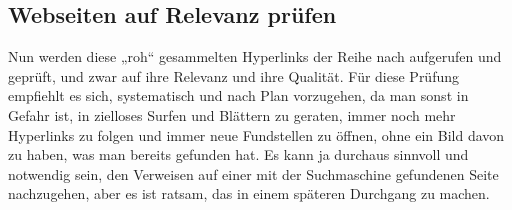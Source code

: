 \documentclass[]{book}
\theoremstyle{definition}
\theoremstyle{definition}
\theoremstyle{definition}
\theoremstyle{remark}
\begin{document}
\subsection{Webseiten auf Relevanz
prüfen}\label{webseiten-auf-relevanz-prufen}

Nun werden diese „roh`` gesammelten Hyperlinks der Reihe nach aufgerufen
und geprüft, und zwar auf ihre Relevanz und ihre Qualität. Für diese
Prüfung empfiehlt es sich, systematisch und nach Plan vorzugehen, da man
sonst in Gefahr ist, in zielloses Surfen und Blättern zu geraten, immer
noch mehr Hyperlinks zu folgen und immer neue Fundstellen zu öffnen,
ohne ein Bild davon zu haben, was man bereits gefunden hat. Es kann ja
durchaus sinnvoll und notwendig sein, den Verweisen auf einer mit der
Suchmaschine gefundenen Seite nachzugehen, aber es ist ratsam, das in
einem späteren Durchgang zu machen.
\end{document}
